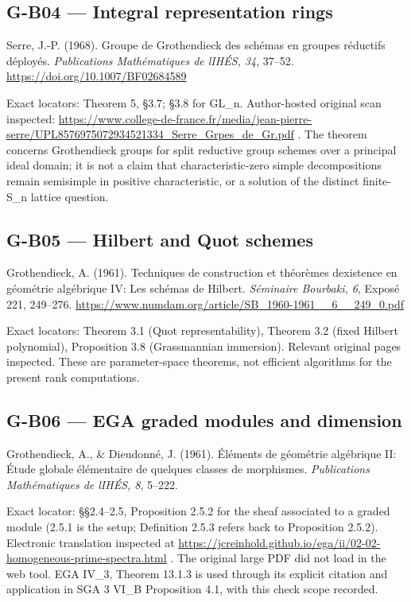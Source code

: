 \documentclass[11pt,a4paper]{article}
\theoremstyle{definition}\newtheorem{definition}{Definition}
\begin{document}
\subsection{G-B04 --- Integral representation
rings}\label{g-b04--integral-representation-rings}

Serre, J.-P. (1968). Groupe de Grothendieck des schémas en groupes
réductifs déployés. \emph{Publications Mathématiques de
l\textquotesingle IHÉS, 34}, 37--52.
\url{https://doi.org/10.1007/BF02684589}

Exact locators: Theorem 5, §3.7; §3.8 for GL\_n. Author-hosted original
scan inspected:
\url{https://www.college-de-france.fr/media/jean-pierre-serre/UPL8576975072934521334_Serre_Grpes_de_Gr.pdf}
. The theorem concerns Grothendieck groups for split reductive group
schemes over a principal ideal domain; it is not a claim that
characteristic-zero simple decompositions remain semisimple in positive
characteristic, or a solution of the distinct finite-S\_n lattice
question.

\subsection{G-B05 --- Hilbert and Quot
schemes}\label{g-b05--hilbert-and-quot-schemes}

Grothendieck, A. (1961). Techniques de construction et théorèmes
d\textquotesingle existence en géométrie algébrique IV: Les schémas de
Hilbert. \emph{Séminaire Bourbaki, 6}, Exposé 221, 249--276.
\url{https://www.numdam.org/article/SB_1960-1961__6__249_0.pdf}

Exact locators: Theorem 3.1 (Quot representability), Theorem 3.2 (fixed
Hilbert polynomial), Proposition 3.8 (Grassmannian immersion). Relevant
original pages inspected. These are parameter-space theorems, not
efficient algorithms for the present rank computations.

\subsection{G-B06 --- EGA graded modules and
dimension}\label{g-b06--ega-graded-modules-and-dimension}

Grothendieck, A., \& Dieudonné, J. (1961). Éléments de géométrie
algébrique II: Étude globale élémentaire de quelques classes de
morphismes. \emph{Publications Mathématiques de l\textquotesingle IHÉS,
8}, 5--222.

Exact locator: §§2.4--2.5, Proposition 2.5.2 for the sheaf associated to
a graded module (2.5.1 is the setup; Definition 2.5.3 refers back to
Proposition 2.5.2). Electronic translation inspected at
\url{https://jcreinhold.github.io/ega/ii/02-02-homogeneous-prime-spectra.html}
. The original large PDF did not load in the web tool. EGA IV\_3,
Theorem 13.1.3 is used through its explicit citation and application in
SGA 3 VI\_B Proposition 4.1, with this check scope recorded.
\end{document}

